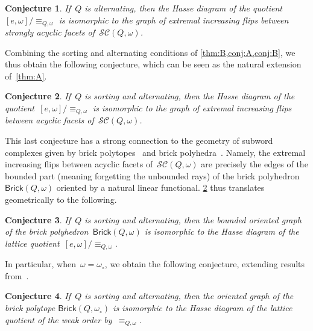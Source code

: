 \documentclass[reqno]{amsart}
\newtheorem{conjectureA}{Conjecture}
\theoremstyle{definition}
\newcommand{\wo}{\omega_\circ} %
\newcommand{\subwordComplex}{\mathcal{SC}} %
\newcommand{\brickPolyhedron}{\mathsf{Brick}} %
\begin{document}
\begin{conjectureA}
\label{conj:B}
If~$Q$ is alternating, then the Hasse diagram of the quotient~$[e, \omega]/\equiv_{Q, \omega}$ is isomorphic to the graph of extremal increasing flips between strongly acyclic facets of~$\subwordComplex(Q, \omega)$.
\end{conjectureA}

Combining the sorting and alternating conditions of \cref{thm:B,conj:A,conj:B}, we thus obtain the following conjecture, which can be seen as the natural extension of~\cref{thm:A}.

\begin{conjectureA}
\label{conj:C}
If~$Q$ is sorting and alternating, then the Hasse diagram of the quotient~$[e, \omega]/\equiv_{Q, \omega}$ is isomorphic to the graph of extremal increasing flips between acyclic facets of~$\subwordComplex(Q, \omega)$.
\end{conjectureA}

This last conjecture has a strong connection to the geometry of subword complexes given by brick polytopes~\cite{PilaudSantos-brickPolytope, PilaudStump-brickPolytope} and brick polyhedra~\cite{JahnStump}.
Namely, the extremal increasing flips between acyclic facets of~$\subwordComplex(Q, \omega)$ are precisely the edges of the bounded part (meaning forgetting the unbounded rays) of the brick polyhedron~$\brickPolyhedron(Q, \omega)$ oriented by a natural linear functional.
\cref{conj:C} thus translates geometrically to the following.

\begin{conjectureA}
\label{conj:D}
If~$Q$ is sorting and alternating, then the bounded oriented graph of the brick polyhedron~$\brickPolyhedron(Q, \omega)$ is isomorphic to the Hasse diagram of the lattice quotient~$[e, \omega]/\equiv_{Q, \omega}$.
\end{conjectureA}

In particular, when~$\omega = \wo$, we obtain the following conjecture, extending results from~\cite{Pilaud-brickAlgebra}.

\begin{conjectureA}
\label{conj:E}
If~$Q$ is sorting and alternating, then the oriented graph of the brick polytope $\brickPolyhedron(Q, \wo)$ is isomorphic to the Hasse diagram of the lattice quotient of the weak order by~$\equiv_{Q, \omega}$.
\end{conjectureA}

\end{document}
